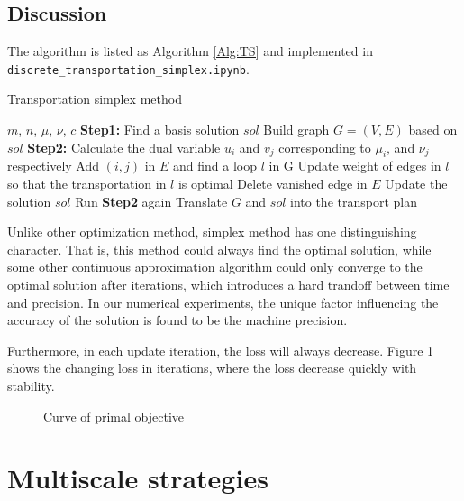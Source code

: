 \documentclass[english]{pkupaper}
\begin{document}
\subsection{Discussion}

The algorithm is listed as Algorithm \ref{Alg:TS} and implemented in \verb"discrete_transportation_simplex.ipynb".

\begin{algorithm}
	\caption{Transportation simplex method} \label{Alg:TS}
	\begin{algorithmic}
		\REQUIRE $m$, $n$, $\mu$, $\nu$, $c$
		\STATE \textbf{Step1:} 
		\STATE Find a basis solution $\mathit{sol}$
		\STATE Build graph $G = (V, E)$ based on $\mathit{sol}$
		\STATE \textbf{Step2:} 
		\STATE Calculate the dual variable $u_i$ and $v_j$ corresponding to $\mu_i$, and $\nu_j$ respectively
			\STATE Add $(i, j)$ in $E$ and find a loop $l$ in G
			\STATE Update weight of edges in $l$ so that the transportation in $l$ is optimal
			\STATE Delete vanished edge in $E$
			\STATE Update the solution $\mathit{sol}$
			\STATE Run \textbf{Step2} again
		\ENDIF
		\STATE Translate $G$ and $\mathit{sol}$ into the transport plan
	\end{algorithmic}
\end{algorithm}

Unlike other optimization method, simplex method has one distinguishing character. That is, this method could always find the optimal solution, while some other continuous approximation algorithm could only converge to the optimal solution after iterations, which introduces a hard trandoff between time and precision. In our numerical experiments, the unique factor influencing the accuracy of the solution is found to be the machine precision.

Furthermore, in each update iteration, the loss will always decrease. Figure \ref{Fig:CPO} shows the changing loss in iterations, where the loss decrease quickly with stability.

\begin{figure}
\centering
\scalebox{0.65}{}
\caption{Curve of primal objective} \label{Fig:CPO}
\end{figure}

\section{Multiscale strategies} \label{Sec:MS}
\end{document}
